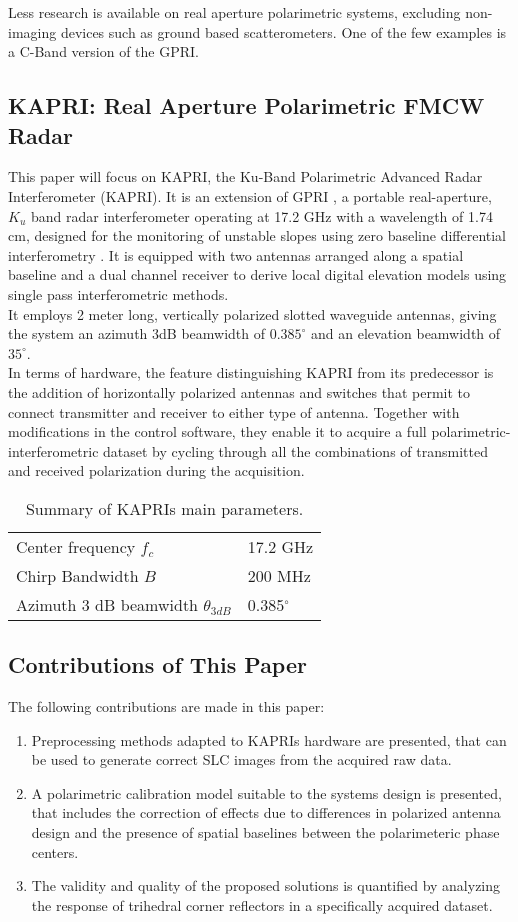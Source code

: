 Less research is available on real aperture polarimetric systems, excluding non-imaging devices such as ground based scatterometers. One of the few examples is a C-Band version of the GPRI\cite{Cherukumilli2012}.
\subsection{KAPRI: Real Aperture Polarimetric FMCW Radar}
This paper will focus on KAPRI, the Ku-Band Polarimetric Advanced Radar Interferometer (KAPRI)\cite{Baffelli2016a}. It is an extension of GPRI \cite{werner_gpri_2012,Strozzi2011, Werner2008}, a portable real-aperture, $K_u$ band radar interferometer operating at 17.2 GHz with a wavelength of 1.74 cm, designed 
for the monitoring of unstable slopes using zero baseline differential interferometry \cite{Massonnet1993}. It is equipped with two antennas arranged along a spatial baseline and a dual channel receiver to derive local digital elevation models using single pass interferometric methods.\\
It employs  2 meter long, vertically polarized slotted waveguide antennas, giving the system an azimuth 3dB beamwidth of $0.385^\circ$ and an elevation beamwidth of $35^\circ$.\\
In terms of hardware, the feature distinguishing KAPRI from its predecessor is the addition of horizontally polarized antennas and switches that permit to connect transmitter and receiver to either type of antenna. Together with modifications in the control software, they enable it to acquire a full polarimetric-interferometric dataset by cycling through all the combinations of transmitted and received polarization during the acquisition.
\begin{table}
	\centering
	\begin{tabular}{ll}
		\hline
		Center frequency $f_c$ & 17.2 GHz\\
		Chirp Bandwidth $B$ & 200 MHz\\
		Azimuth 3 dB beamwidth $\theta_{3dB}$ & 0.385$^\circ$\\
		\hline
	\end{tabular}
	\caption{Summary of KAPRIs main parameters.}
\end{table}
\subsection{Contributions of This Paper}
The following contributions are made in this paper:
\begin{enumerate}
	\item Preprocessing methods adapted to KAPRIs hardware are presented, that can be used to generate correct SLC images from the acquired raw data.
	\item A polarimetric calibration model suitable to the systems design is presented, that includes the correction of effects due to differences in polarized antenna design and the presence of spatial baselines between the polarimeteric phase centers.
	\item The validity and quality of the proposed solutions is  quantified by analyzing the response of trihedral corner reflectors in a specifically acquired dataset.
\end{enumerate}
